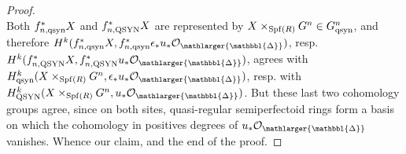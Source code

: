 \documentclass{amsart}
\newcommand{\prism}{{\mathlarger{\mathbbl{\Delta}}}}
\theoremstyle{plain}
\newtheorem{lemma}[theorem]{Lemma}
\theoremstyle{definition}
\newcommand{\Fil}{\mathrm{Fil}}
\newcommand{\red}[1]{{\color{black} #1}}
\begin{document}
\begin{proof}
$$   $$
Both $f_{n, \rm qsyn}^\ast X$ and $f_{n, \rm QSYN}^\ast X$ are represented by $X \times_{\mathrm{Spf}(R)} G^n \in G_{\rm qsyn}^n$, and therefore $H^k(f_{n, \rm qsyn}^\ast X,  f_{n, \rm qsyn}^\ast \epsilon_\ast u_\ast \mathcal{O}_\prism)$, resp. $H^k(f_{n, \rm QSYN}^\ast X,  f_{n, \rm QSYN}^\ast  u_\ast \mathcal{O}_\prism)$, agrees with $H_{\rm qsyn}^k(X \times_{\mathrm{Spf}(R)} G^n, \epsilon_\ast u_\ast \mathcal{O}_\prism)$, resp. with $H_{\rm QSYN}^k(X \times_{\mathrm{Spf}(R)} G^n, u_\ast \mathcal{O}_\prism)$. But these last two cohomology groups agree, since on both sites, quasi-regular semiperfectoid rings form a basis on which the cohomology in positives degrees of $u_\ast \mathcal{O}_\prism$ vanishes. Whence our claim, and the end of the proof. 
\end{proof}


%  
%  
\end{document}
